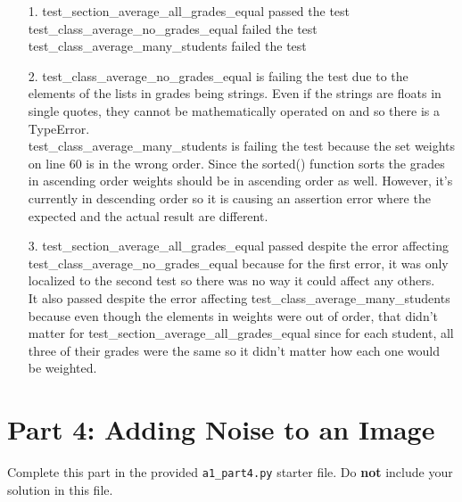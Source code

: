 \documentclass[fontsize=11pt]{article}
\begin{document}

    \begin{enumerate}
        \item[1.]
        test\_section\_average\_all\_grades\_equal passed the test \\
        test\_class\_average\_no\_grades\_equal failed the test \\
        test\_class\_average\_many\_students failed the test

        \item[2.]
        test\_class\_average\_no\_grades\_equal is failing the test due to the elements of the lists in grades being strings. Even if the strings are floats in single quotes, they cannot be mathematically operated on and so there is a TypeError. \\
        test\_class\_average\_many\_students is failing the test because the set weights on line 60 is in the wrong order. Since the sorted() function sorts the grades in ascending order weights should be in ascending order as well. However, it's currently in descending order so it is causing an assertion error where the expected and the actual result are different.

        \item[3.]
        test\_section\_average\_all\_grades\_equal passed despite the error affecting test\_class\_average\_no\_grades\_equal because for the first error, it was only localized to the second test so there was no way it could affect any others. \\
        It also passed despite the error affecting test\_class\_average\_many\_students because even though the elements in weights were out of order, that didn't matter for test\_section\_average\_all\_grades\_equal since for each student, all three of their grades were the same so it didn't matter how each one would be weighted.
    \end{enumerate}

    \section*{Part 4: Adding Noise to an Image}

    Complete this part in the provided \texttt{a1\_part4.py} starter file.
    Do \textbf{not} include your solution in this file.
\end{document}
